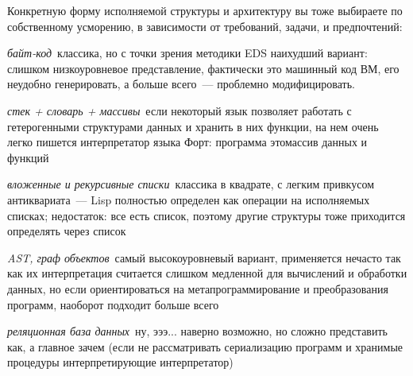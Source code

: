 Конкретную форму исполняемой структуры и архитектуру  вы тоже выбираете по собственному
усморению, в зависимости от требований, задачи, и предпочтений:
\begin{description}
    \item{\emph{байт-код}}\ классика, но с точки зрения методики EDS наихудший вариант: слишком низкоуровневое
    представление, фактически это машинный код ВМ, его неудобно генерировать, а больше всего\ --- проблемно
    модифицировать.
    \item{\emph{стек + словарь + массивы}}\ если некоторый язык позволяет работать с
    гетерогенными
    структурами данных и хранить в них функции, на нем очень легко пишется интерпретатор языка Форт:
    программа этомассив данных и функций
    \item{\emph{вложенные и рекурсивные списки}}\ классика в квадрате, с легким привкусом антиквариата\ --- Lisp полностью
    определен как операции на исполняемых списках; недостаток: все есть список, поэтому другие структуры тоже приходится
    определять через список
    \item{\emph{AST, граф объектов}}\ самый высокоуровневый вариант, применяется
    нечасто так как
    их интерпретация считается слишком медленной для вычислений и обработки данных,
    но если ориентироваться на метапрограммирование и преобразования программ, наоборот подходит больше всего
    \item{\emph{реляционная база данных}}\ ну, эээ... наверно возможно, но сложно представить как, а главное зачем
    (если не рассматривать сериализацию программ и хранимые процедуры интерпретирующие интерпретатор)
\end{description}